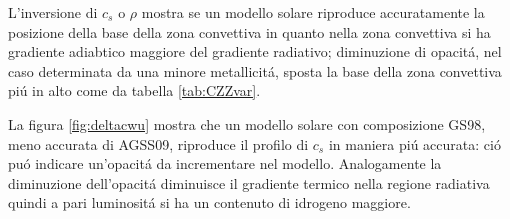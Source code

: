 \documentclass[../main.tex]{subfiles}
\begin{document}
L'inversione di $c_s$ o $\rho$ mostra se un modello solare riproduce accuratamente la posizione della base della zona convettiva in quanto nella zona convettiva si ha gradiente adiabtico maggiore del gradiente radiativo; diminuzione di opacit\'a, nel caso determinata da una minore metallicit\'a, sposta la base della zona convettiva pi\'u in alto come da tabella \ref{tab:CZZvar}.

La figura \ref{fig:deltacwu} mostra che un modello solare con composizione GS98, meno accurata di AGSS09, riproduce il profilo di $c_s$ in maniera pi\'u accurata: ci\'o pu\'o indicare un'opacit\'a da incrementare nel modello. Analogamente la diminuzione dell'opacit\'a diminuisce il gradiente termico nella regione radiativa quindi a pari luminosit\'a si ha un contenuto di idrogeno maggiore.


\begin{comment}
Opacity changes affect structure radiative interior and position of $R_{cz}$
Equation of state depends on number of free particle per unit volume - number density of heavy elements is two order of magnitude smaller than that of He, H: small effect on pressure.
Ionization os elements causes $\Gamma_1$ to decrease in ionization zone.
The effect of Z on convection zone is due to effect on EOS.
CNO cycle increase vs opacity increase: vedi tab.12 bahcall06
\end{comment}
\end{document}
